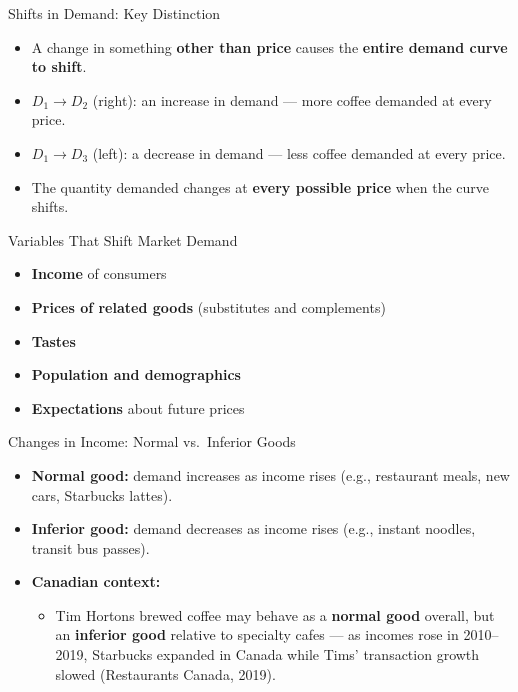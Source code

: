 \documentclass[aspectratio=169]{beamer}
\begin{document}
\begin{frame}{Shifts in Demand: Key Distinction}
\transfade
\begin{itemize}[<+->]
  \item A change in something \textbf{other than price} causes the \textbf{entire demand curve to shift}.
  \item $D_1 \to D_2$ (right): an \alert{increase in demand} --- more coffee demanded at every price.
  \item $D_1 \to D_3$ (left): a \alert{decrease in demand} --- less coffee demanded at every price.
  \item The quantity demanded changes at \textbf{every possible price} when the curve shifts.
\end{itemize}
\end{frame}

\begin{frame}{Variables That Shift Market Demand}
\transfade
\begin{itemize}[<+->]
  \item \textbf{Income} of consumers
  \item \textbf{Prices of related goods} (substitutes and complements)
  \item \textbf{Tastes}
  \item \textbf{Population and demographics}
  \item \textbf{Expectations} about future prices
\end{itemize}
\end{frame}

\begin{frame}{Changes in Income: Normal vs.\ Inferior Goods}
\transfade
\begin{itemize}[<+->]
  \item \textbf{Normal good:} demand increases as income rises (e.g., restaurant meals, new cars, Starbucks lattes).
  \item \textbf{Inferior good:} demand decreases as income rises (e.g., instant noodles, transit bus passes).
  \item \textbf{Canadian context:}
  \begin{itemize}[<+->]
    \item Tim Hortons brewed coffee may behave as a \textbf{normal good} overall, but an \textbf{inferior good} relative to specialty cafes --- as incomes rose in 2010--2019, Starbucks expanded in Canada while Tims' transaction growth slowed (Restaurants Canada, 2019).
  \end{itemize}
\end{itemize}
\end{frame}
\end{document}
